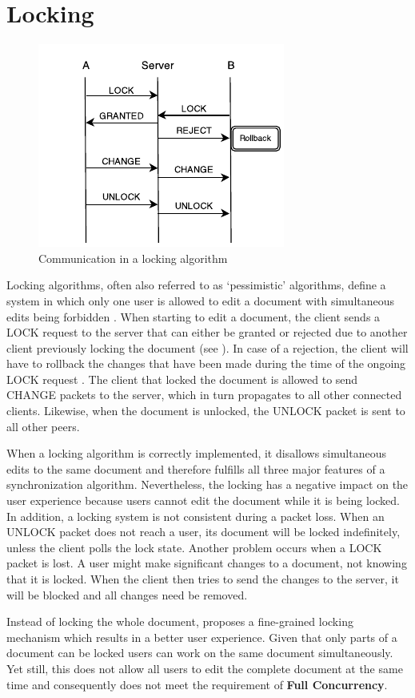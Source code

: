 \section{Locking}
\label{sync-locking}

\begin{figure}[htb]
  \centerline{\includegraphics[width=0.65\linewidth]{images/Locking.pdf}}
  \caption[Communication in a locking algorithm]{Communication in a locking algorithm}
  \label{fig:Locking}
\end{figure}

Locking algorithms, often also referred to as `pessimistic' algorithms, define a system in which only one user is allowed to edit a document with simultaneous edits being forbidden \cite[p. 2]{fraser2009differential}. When starting to edit a document, the client sends a LOCK request to the server that can either be granted or rejected due to another client previously locking the document (see ). In case of a rejection, the client will have to rollback the changes that have been made during the time of the ongoing LOCK request \cite[p. 5]{sun2002locking}. The client that locked the document is allowed to send CHANGE packets to the server, which in turn propagates to all other connected clients. Likewise, when the document is unlocked, the UNLOCK packet is sent to all other peers.

When a locking algorithm is correctly implemented, it disallows simultaneous edits to the same document and therefore fulfills all three major features of a synchronization algorithm. Nevertheless, the locking has a negative impact on the user experience because users cannot edit the document while it is being locked. In addition, a locking system is not consistent during a packet loss. When an UNLOCK packet does not reach a user, its document will be locked indefinitely, unless the client polls the lock state. Another problem occurs when a LOCK packet is lost. A user might make significant changes to a document, not knowing that it is locked. When the client then tries to send the changes to the server, it will be blocked and all changes need be removed.

Instead of locking the whole document, \cite[p. 5ff]{sun2002locking} proposes a fine-grained locking mechanism which results in a better user experience. Given that only parts of a document can be locked users can work on the same document simultaneously. Yet still, this does not allow all users to edit the complete document at the same time and consequently does not meet the requirement of \textbf{Full Concurrency}.